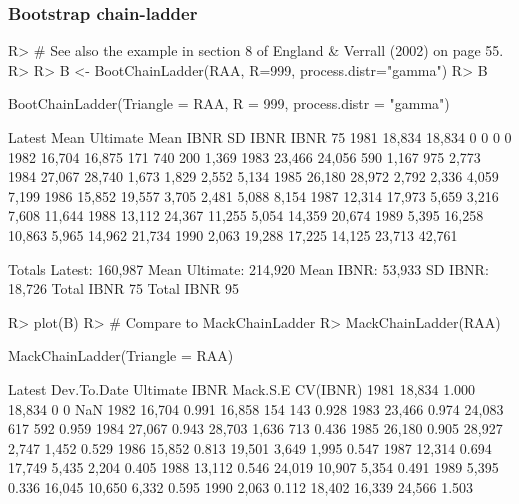 \documentclass{article}
\begin{document}
\subsubsection{Bootstrap chain-ladder}
\begin{Schunk}
\begin{Sinput}
R> # See also the example in section 8 of England & Verrall (2002) on page 55.
R> 
R> B <- BootChainLadder(RAA, R=999, process.distr="gamma")
R> B
\end{Sinput}
\begin{Soutput}
BootChainLadder(Triangle = RAA, R = 999, process.distr = "gamma")

     Latest Mean Ultimate Mean IBNR SD IBNR IBNR 75%
1981 18,834        18,834         0       0        0        0
1982 16,704        16,875       171     740      200    1,369
1983 23,466        24,056       590   1,167      975    2,773
1984 27,067        28,740     1,673   1,829    2,552    5,134
1985 26,180        28,972     2,792   2,336    4,059    7,199
1986 15,852        19,557     3,705   2,481    5,088    8,154
1987 12,314        17,973     5,659   3,216    7,608   11,644
1988 13,112        24,367    11,255   5,054   14,359   20,674
1989  5,395        16,258    10,863   5,965   14,962   21,734
1990  2,063        19,288    17,225  14,125   23,713   42,761

                 Totals
Latest:         160,987
Mean Ultimate:  214,920
Mean IBNR:       53,933
SD IBNR:         18,726
Total IBNR 75%
Total IBNR 95%
\end{Soutput}
\begin{Sinput}
R> plot(B)
R> # Compare to MackChainLadder
R> MackChainLadder(RAA)
\end{Sinput}
\begin{Soutput}
MackChainLadder(Triangle = RAA)

     Latest Dev.To.Date Ultimate   IBNR Mack.S.E CV(IBNR)
1981 18,834       1.000   18,834      0        0      NaN
1982 16,704       0.991   16,858    154      143    0.928
1983 23,466       0.974   24,083    617      592    0.959
1984 27,067       0.943   28,703  1,636      713    0.436
1985 26,180       0.905   28,927  2,747    1,452    0.529
1986 15,852       0.813   19,501  3,649    1,995    0.547
1987 12,314       0.694   17,749  5,435    2,204    0.405
1988 13,112       0.546   24,019 10,907    5,354    0.491
1989  5,395       0.336   16,045 10,650    6,332    0.595
1990  2,063       0.112   18,402 16,339   24,566    1.503


\end{Soutput}
\end{Schunk}
\end{document}
